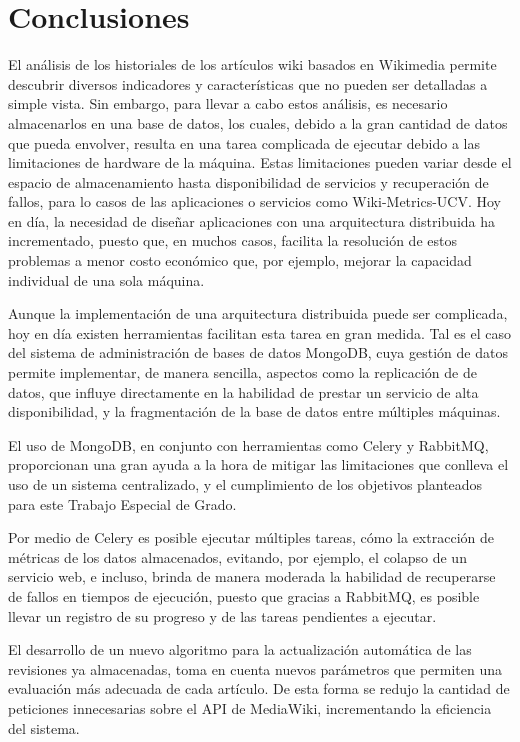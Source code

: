 \section{Conclusiones}

El análisis de los historiales de los artículos wiki basados en Wikimedia permite
descubrir diversos indicadores y características que no pueden ser detalladas a simple
vista.
Sin embargo, para llevar a cabo estos análisis, es necesario almacenarlos en una base
de datos, los cuales, debido a la gran cantidad de datos que pueda envolver, resulta
en una tarea complicada de ejecutar debido a las limitaciones de hardware de la
máquina.
Estas limitaciones pueden variar desde el espacio de almacenamiento hasta disponibilidad
de servicios y recuperación de fallos, para lo casos de las aplicaciones o servicios como
Wiki-Metrics-UCV.
Hoy en día, la necesidad de diseñar aplicaciones con una arquitectura distribuida
ha incrementado, puesto que, en muchos casos, facilita la resolución de estos problemas
a menor costo económico que, por ejemplo, mejorar la capacidad individual de una sola máquina.

Aunque la implementación de una arquitectura distribuida puede ser complicada,
hoy en día existen herramientas facilitan esta tarea en gran medida.
Tal es el caso del sistema de administración de bases de datos MongoDB, cuya gestión
de datos permite implementar, de manera sencilla, aspectos como la replicación de
de datos, que influye directamente en la habilidad de prestar un servicio de alta disponibilidad,
y la fragmentación de la base de datos entre múltiples máquinas.

El uso de MongoDB, en conjunto con herramientas como Celery y RabbitMQ, proporcionan
una gran ayuda a la hora de mitigar las limitaciones que conlleva el uso de un sistema centralizado, y el cumplimiento de los objetivos planteados para este Trabajo Especial de Grado.

Por medio de Celery es posible ejecutar múltiples tareas, cómo la extracción de métricas de los
datos almacenados, evitando, por ejemplo, el colapso de un servicio web, e incluso, brinda
de manera moderada la habilidad de recuperarse de fallos en tiempos de ejecución, puesto que gracias a RabbitMQ,
es posible llevar un registro de su progreso y de las tareas pendientes a ejecutar.

El desarrollo de un nuevo algoritmo para la actualización automática de las revisiones ya almacenadas, toma en cuenta nuevos parámetros que permiten una evaluación más adecuada de cada artículo.
De esta forma se redujo la cantidad de peticiones innecesarias sobre el API de MediaWiki, incrementando la eficiencia del sistema.

